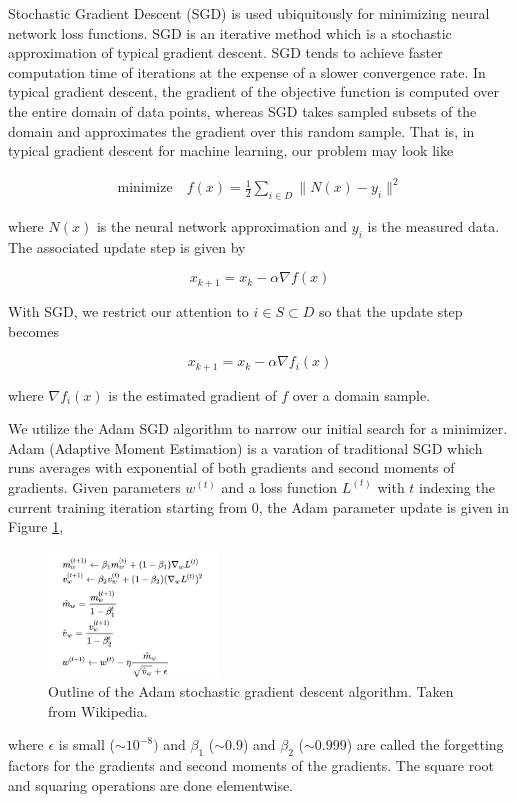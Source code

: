 Stochastic Gradient Descent (SGD) is used ubiquitously for minimizing neural network loss functions. SGD is an iterative 
method which is a stochastic approximation of typical gradient descent. SGD tends to achieve faster computation time of 
iterations at the expense of a slower convergence rate. In typical gradient descent, the gradient of the objective 
function is computed over the entire domain  of data points, whereas SGD takes sampled subsets of the domain and 
approximates the gradient over this random sample. That is, in typical gradient descent for machine learning, our 
problem may look like

\begin{align*}
    \text{minimize} \hspace{1em} f(x) = \frac{1}{2}\sum_{i \in D} \|N(x) - y_i \|^2
\end{align*}

where $N(x)$ is the neural network approximation and $y_i$ is the measured data. The associated update step is given by

$$
x_{k+1} = x_k - \alpha \nabla f(x)
$$

With SGD, we restrict our attention to $i \in S \subset D$ so that the update step becomes

$$
x_{k+1} = x_k - \alpha \nabla f_i(x)
$$

\noindent where $\nabla f_i(x)$ is the estimated gradient of $f$ over a domain sample.

We utilize the Adam SGD algorithm to narrow our initial search for a minimizer. Adam (Adaptive Moment Estimation) is a 
varation of traditional SGD which runs averages with exponential  of both gradients and second moments
of gradients. Given parameters $w^{(t)}$ and a loss function $L^{(t)}$ with $t$ indexing the current training iteration 
starting from 0, the Adam parameter update is given in Figure \ref{fig:adam_algorithm},

\begin{figure}[H]
    \includegraphics[width=0.40\textwidth]{images/adam.png}
    \centering
    \caption{Outline of the Adam stochastic gradient descent algorithm. Taken from Wikipedia.}
    \label{fig:adam_algorithm}
\end{figure}

where $\epsilon$ is small ($\sim10^{-8})$ and $\beta_1$ ($\sim0.9$) and $\beta_2$ ($\sim0.999$) are called the forgetting factors for the gradients and second moments of the gradients. The square root and squaring operations are done elementwise. 